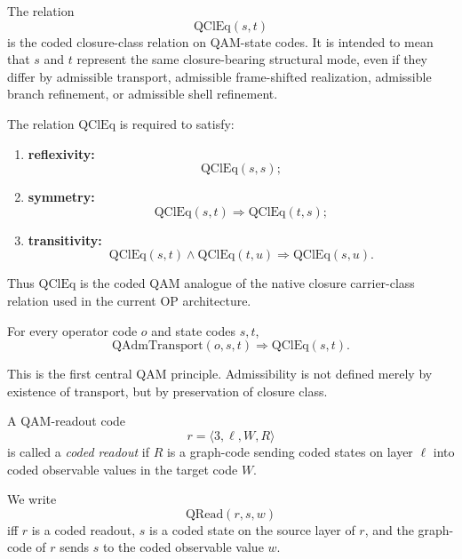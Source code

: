\begin{definition}
The relation
\[
\mathrm{QClEq}(s,t)
\]
is the coded closure-class relation on QAM-state codes. It is intended to mean that $s$ and $t$ represent the same closure-bearing structural mode, even if they differ by admissible transport, admissible frame-shifted realization, admissible branch refinement, or admissible shell refinement.
\end{definition}

\begin{axiom}
The relation $\mathrm{QClEq}$ is required to satisfy:
\begin{enumerate}
\item \textbf{reflexivity:}
\[
\mathrm{QClEq}(s,s);
\]
\item \textbf{symmetry:}
\[
\mathrm{QClEq}(s,t)\Longrightarrow \mathrm{QClEq}(t,s);
\]
\item \textbf{transitivity:}
\[
\mathrm{QClEq}(s,t)\wedge \mathrm{QClEq}(t,u)\Longrightarrow \mathrm{QClEq}(s,u).
\]
\end{enumerate}
\end{axiom}

\begin{remark}
Thus $\mathrm{QClEq}$ is the coded QAM analogue of the native closure carrier-class relation used in the current OP architecture.
\end{remark}

\begin{axiom}
For every operator code $o$ and state codes $s,t$,
\[
\mathrm{QAdmTransport}(o,s,t)\Longrightarrow \mathrm{QClEq}(s,t).
\]
\end{axiom}

\begin{remark}
This is the first central QAM principle. Admissibility is not defined merely by existence of transport, but by preservation of closure class.
\end{remark}

\begin{definition}
A QAM-readout code
\[
r=\langle 3,\ell,W,R\rangle
\]
is called a \emph{coded readout} if $R$ is a graph-code sending coded states on layer $\ell$ into coded observable values in the target code $W$.
\end{definition}

\begin{definition}
We write
\[
\mathrm{QRead}(r,s,w)
\]
iff $r$ is a coded readout, $s$ is a coded state on the source layer of $r$, and the graph-code of $r$ sends $s$ to the coded observable value $w$.
\end{definition}

